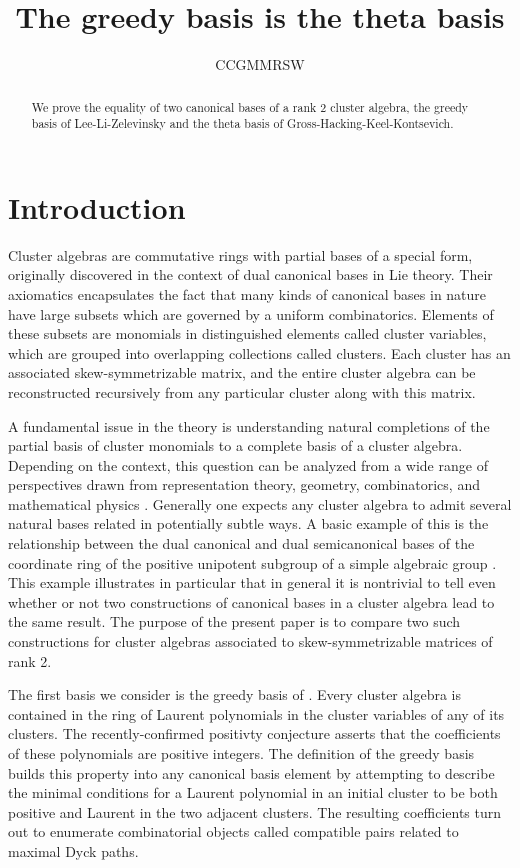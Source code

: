 \documentclass[11pt]{amsart}
\title{The greedy basis is the theta basis}
\author{CCGMMRSW}
\theoremstyle{remark}
\numberwithin{equation}{section}
\begin{document}
\maketitle

\begin{abstract}
We prove the equality of two canonical bases of a rank 2 cluster algebra, the greedy basis of Lee-Li-Zelevinsky and the theta basis of Gross-Hacking-Keel-Kontsevich.
\end{abstract}

\section{Introduction}

Cluster algebras are commutative rings with partial bases of a special form, originally discovered in the context of dual canonical bases in Lie theory.  Their axiomatics encapsulates the fact that many kinds of canonical bases in nature have large subsets which are governed by a uniform combinatorics.  Elements of these subsets are monomials in distinguished elements called cluster variables, which are grouped into overlapping collections called clusters.  Each cluster has an associated skew-symmetrizable matrix, and the entire cluster algebra can be reconstructed recursively from any particular cluster along with this matrix.

A fundamental issue in the theory is understanding natural completions of the partial basis of cluster monomials to a complete basis of a cluster algebra.  Depending on the context, this question can be analyzed from a wide range of perspectives drawn from representation theory, geometry, combinatorics, and mathematical physics \cite{???}.  Generally one expects any cluster algebra to admit several natural bases related in potentially subtle ways.  A basic example of this is the relationship between the dual canonical and dual semicanonical bases of the coordinate ring of the positive unipotent subgroup of a simple algebraic group \cite{???}.  This example illustrates in particular that in general it is nontrivial to tell even whether or not two constructions of canonical bases in a cluster algebra lead to the same result.  The purpose of the present paper is to compare two such constructions for cluster algebras associated to skew-symmetrizable matrices of rank 2.  

The first basis we consider is the greedy basis of \cite{LLZ}.  Every cluster algebra is contained in the ring of Laurent polynomials in the cluster variables of any of its clusters.  The recently-confirmed positivty conjecture asserts that the coefficients of these polynomials are positive integers.  The definition of the greedy basis builds this property into any canonical basis element by attempting to describe the minimal conditions for a Laurent polynomial in an initial cluster to be both positive and Laurent in the two adjacent clusters.  The resulting coefficients turn out to enumerate combinatorial objects called compatible pairs related to maximal Dyck paths.  
\end{document}
